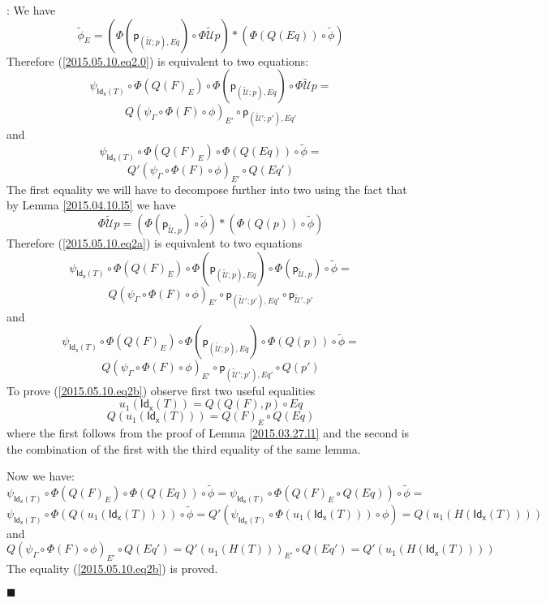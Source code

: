 \documentclass[12pt]{article}
\numberwithin{equation}{section}
\newenvironment{eq}{\begin{equation}}{\end{equation}}
\newenvironment{myproof}{{\bf Proof}:}{$\blacksquare$ \vskip 5mm }
\newcommand{\llabel}[1]{\label{#1}}
\newcommand{\wt}{\widetilde}
\newcommand{\p}{\mathsf{p}}
\newcommand{\Idx}{\mathsf{Id_x}} %
\newcommand{\U}{\mathcal{U}}
\begin{document}
\begin{myproof}
We have
%
$$\wt{\phi}_E=(\Phi(\p_{(\wt{\U};p),Eq})\circ
\Phi\wt{\U}p)*(\Phi(Q(Eq))\circ\wt{\phi})$$
%
Therefore (\ref{2015.05.10.eq2.0}) is equivalent to two equations:
%
$$\psi_{\Idx(T)}\circ \Phi(Q(F)_E)\circ \Phi(\p_{(\wt{\U};p),Eq})\circ
\Phi\wt{\U}p=$$
\begin{eq}
\label{2015.05.10.eq2a}
Q(\psi_{\Gamma}\circ \Phi(F)\circ \phi)_{E'}\circ \p_{(\wt{\U}';p'),Eq'}
\end{eq}
%
and
%
$$\psi_{\Idx(T)}\circ \Phi(Q(F)_E)\circ \Phi(Q(Eq))\circ\wt{\phi}=$$
\begin{eq}
\label{2015.05.10.eq2b}
Q'(\psi_{\Gamma}\circ \Phi(F)\circ \phi)_{E'}\circ Q(Eq')
\end{eq}
%
The first equality we will have to decompose further into two using the fact
that by Lemma \ref{2015.04.10.l5} we have
%
$$\Phi\wt{\U}p=(\Phi(\p_{\wt{\U},p})\circ\wt{\phi})*(\Phi(Q(p))\circ \wt{\phi})$$
%
Therefore (\ref{2015.05.10.eq2a}) is equivalent to two equations
%
$$\psi_{\Idx(T)}\circ \Phi(Q(F)_E)\circ \Phi(\p_{(\wt{\U};p),Eq})\circ
\Phi(\p_{\wt{\U},p})\circ\wt{\phi}=$$
\begin{eq}
\llabel{2015.05.10.eq2aa} Q(\psi_{\Gamma}\circ \Phi(F)\circ \phi)_{E'}\circ
\p_{(\wt{\U}';p'),Eq'}\circ \p_{\wt{\U}',p'}
\end{eq}
%
and
%
$$\psi_{\Idx(T)}\circ \Phi(Q(F)_E)\circ \Phi(\p_{(\wt{\U};p),Eq})\circ
\Phi(Q(p))\circ\wt{\phi}=$$
\begin{eq}
\llabel{2015.05.10.eq2ab} Q(\psi_{\Gamma}\circ \Phi(F)\circ \phi)_{E'}\circ
\p_{(\wt{\U}';p'),Eq'}\circ Q(p')
\end{eq}
%
To prove (\ref{2015.05.10.eq2b}) observe first two useful equalities
%
$$u_1(\Idx(T))=Q(Q(F),p)\circ Eq$$
%
$$Q(u_1(\Idx(T)))=Q(F)_{E}\circ Q(Eq)$$
%
where the first follows from the proof of Lemma \ref{2015.03.27.l1} and the
second is the combination of the first with the third equality of the same
lemma.

Now we have:
%
$$\psi_{\Idx(T)}\circ \Phi(Q(F)_E)\circ
\Phi(Q(Eq))\circ\wt{\phi}=\psi_{\Idx(T)}\circ \Phi(Q(F)_E\circ
Q(Eq))\circ\wt{\phi}=$$
$$\psi_{\Idx(T)}\circ \Phi(Q(u_1(\Idx(T))))\circ
\wt{\phi}=Q'(\psi_{\Idx(T)}\circ \Phi(u_1(\Idx(T)))\circ
\phi)=Q(u_1(H(\Idx(T))))$$
%
and
%
$$Q(\psi_{\Gamma}\circ \Phi(F)\circ \phi)_{E'}\circ
Q(Eq')=Q'(u_1(H(T)))_{E'}\circ Q(Eq')=Q'(u_1(H(\Idx(T))))$$
%
The equality (\ref{2015.05.10.eq2b}) is proved.


\end{myproof}
\end{document}
